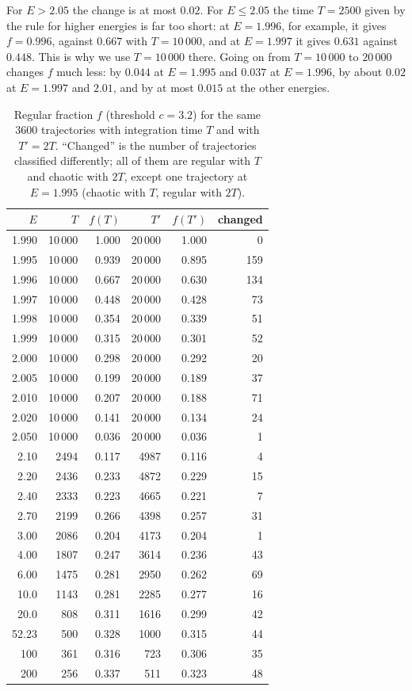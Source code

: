 \documentclass[11pt,a4paper]{article}
\begin{document}
For $E>2.05$ the change is at most $0.02$. For $E\le2.05$ the time $T=2500$ given by the rule for higher energies
is far too short: at $E=1.996$, for example, it gives $f=0.996$, against
$0.667$ with $T=10\,000$, and at $E=1.997$ it gives $0.631$ against $0.448$.
This is why we use $T=10\,000$ there. Going on from $T=10\,000$ to $20\,000$
changes $f$ much less: by $0.044$ at $E=1.995$ and $0.037$ at $E=1.996$, by
about $0.02$ at $E=1.997$ and $2.01$, and by at most $0.015$ at the other
energies.

\begin{table}[H]
\centering
\caption{Regular fraction $f$ (threshold $c=3.2$) for the same $3600$
trajectories with integration time $T$ and with $T'=2T$.
``Changed'' is the number of trajectories classified differently; all of them
are regular with $T$ and chaotic with $2T$, except one trajectory at
$E=1.995$ (chaotic with $T$, regular with $2T$).}
\label{tab:convergence}
\begin{tabular}{@{}rrrrrr@{}}
\toprule
$E$ & $T$ & $f(T)$ & $T'$ & $f(T')$ & changed\\
\midrule
1.990 & 10\,000 & 1.000 & 20\,000 & 1.000 & 0\\
1.995 & 10\,000 & 0.939 & 20\,000 & 0.895 & 159\\
1.996 & 10\,000 & 0.667 & 20\,000 & 0.630 & 134\\
1.997 & 10\,000 & 0.448 & 20\,000 & 0.428 & 73\\
1.998 & 10\,000 & 0.354 & 20\,000 & 0.339 & 51\\
1.999 & 10\,000 & 0.315 & 20\,000 & 0.301 & 52\\
2.000 & 10\,000 & 0.298 & 20\,000 & 0.292 & 20\\
2.005 & 10\,000 & 0.199 & 20\,000 & 0.189 & 37\\
2.010 & 10\,000 & 0.207 & 20\,000 & 0.188 & 71\\
2.020 & 10\,000 & 0.141 & 20\,000 & 0.134 & 24\\
2.050 & 10\,000 & 0.036 & 20\,000 & 0.036 & 1\\
\midrule
2.10  & 2494 & 0.117 & 4987 & 0.116 & 4\\
2.20  & 2436 & 0.233 & 4872 & 0.229 & 15\\
2.40  & 2333 & 0.223 & 4665 & 0.221 & 7\\
2.70  & 2199 & 0.266 & 4398 & 0.257 & 31\\
3.00  & 2086 & 0.204 & 4173 & 0.204 & 1\\
4.00  & 1807 & 0.247 & 3614 & 0.236 & 43\\
6.00  & 1475 & 0.281 & 2950 & 0.262 & 69\\
10.0  & 1143 & 0.281 & 2285 & 0.277 & 16\\
20.0  & 808  & 0.311 & 1616 & 0.299 & 42\\
52.23 & 500  & 0.328 & 1000 & 0.315 & 44\\
100   & 361  & 0.316 & 723  & 0.306 & 35\\
200   & 256  & 0.337 & 511  & 0.323 & 48\\
\bottomrule
\end{tabular}
\end{table}
\end{document}
